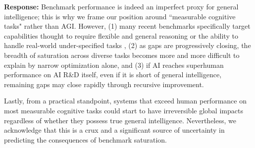 \documentclass[letterpaper,twocolumn]{article}
\begin{document}
\textbf{Response:} Benchmark performance is indeed an imperfect proxy for general intelligence; this is why we frame our position around ``measurable cognitive tasks" rather than AGI.
However, (1) many recent benchmarks specifically target capabilities thought to require flexible and general reasoning \citep{arc_prize_arc-agi-2_2025, wang_enigmaeval_2025} or the ability to handle real-world under-specified tasks \citep{mazeika_remote_2025}, (2) as gaps are progressively closing, the breadth of saturation across diverse tasks becomes more and more difficult to explain by narrow optimization alone, and (3) if AI reaches superhuman performance on AI R\&D itself, even if it is short of general intelligence, remaining gaps may close rapidly through recursive improvement.

Lastly, from a practical standpoint, systems that exceed human performance on most measurable cognitive tasks could start to have irreversible global impacts regardless of whether they possess true general intelligence. Nevertheless, we acknowledge that this is a crux and a significant source of uncertainty in predicting the consequences of benchmark saturation.
\end{document}
